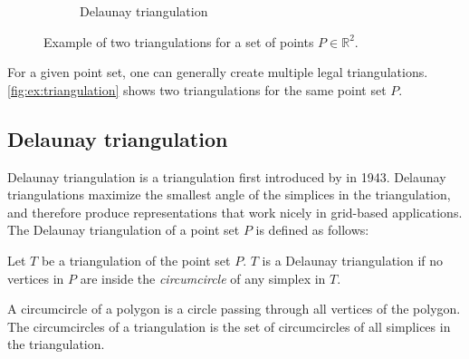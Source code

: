 \begin{figure}[ht]
\begin{subfigure}[b]{0.4\textwidth}
        \caption{Delaunay triangulation}
        \label{fig:triangulation-delaunay}
    \end{subfigure}
    \caption[Example of triangulation]{Example of two triangulations for a set of points $P \in \mathbb{R}^2$.}
    \label{fig:ex:triangulation}
\end{figure}

For a given point set, one can generally create multiple legal triangulations. \autoref{fig:ex:triangulation} shows two triangulations for the same point set $P$.


\subsection{Delaunay triangulation}
Delaunay triangulation is a triangulation first introduced by \textcite{delaunay_1943} in 1943. Delaunay triangulations maximize the smallest angle of the simplices in the triangulation, and therefore produce representations that work nicely in grid-based applications. The Delaunay triangulation of a point set $P$ is defined as follows:
\begin{definition}
Let $T$ be a triangulation of the point set $P$. $T$ is a Delaunay triangulation if no vertices in $P$ are inside the \emph{circumcircle} of any simplex in $T$.
\end{definition}

\begin{definition}[Circumcircle]
A circumcircle of a polygon is a circle passing through all vertices of the polygon. The circumcircles of a triangulation is the set of circumcircles of all simplices in the triangulation.
\end{definition}

